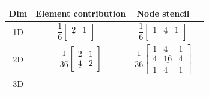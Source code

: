 \begin{table}
  \centering
  \begin{tabular}{|c|c|c|c}
      \hline
      Dim & Element contribution & Node stencil\\
      \hline
      1D &
  \begin{minipage}{4.5cm}
    \begin{equation*}
       \dfrac1{6}\left[\begin{array}{ccc}
          \underline{2} & 1\\
      \end{array}\right] \quad 
    \end{equation*}
  \end{minipage} 
      &
  \begin{minipage}{4.5cm}
    \begin{equation*}
      \dfrac1{6}\left[\begin{array}{ccc}
          1 & \underline{4} & 1\\
      \end{array}\right]
    \end{equation*}
  \end{minipage} 
       \\[4mm]
       \hline
      2D&
  \begin{minipage}{5cm}
    \begin{equation*}
      \dfrac1{36}\left[
        \begin{array}{ccc}
          2 & 1 \\
          \underline{4} & 2
        \end{array}
      \right]
    \end{equation*}
  \end{minipage}  &
  \begin{minipage}{5cm}
    \begin{equation*}
        \dfrac1{36}\left[
          \begin{array}{ccc}
            1 & 4 & 1\\
            4 & \underline{16} & 4 \\
            1 & 4 & 1
          \end{array}
        \right]
    \end{equation*}
  \end{minipage}  \\[4mm]
      \hline
      3D &
  \begin{minipage}{6cm}
    \begin{equation*}
      \begin{array}{ll}

\end{array}
\end{equation*}
\end{minipage}
\end{tabular}
\end{table}
